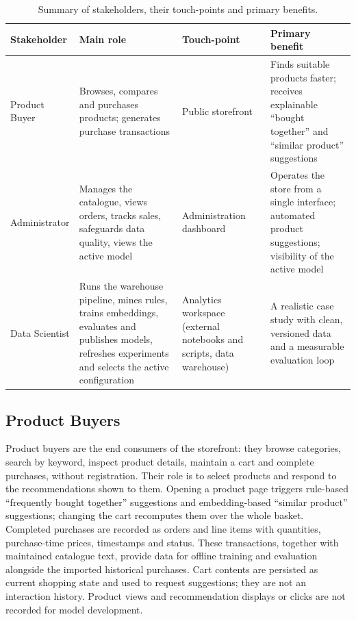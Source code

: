 \documentclass[a4paper,12pt]{article}
\newlength{\tablecontentwidth}
\newcommand{\tablestyle}{%
  \small\setstretch{1.05}%
  \renewcommand{\arraystretch}{1.25}%
  \setlength{\extrarowheight}{3pt}%
  \arrayrulecolor{tableborder}%
}
\begin{document}
\begin{table}[htbp]
  \centering
  \caption{Summary of stakeholders, their touch-points and primary benefits.}
  \label{tab:stakeholders}
  \tablestyle
  \begin{tabular}{|L{0.16\tablecontentwidth}|L{0.28\tablecontentwidth}|L{0.22\tablecontentwidth}|L{0.34\tablecontentwidth}|}
    \hline
    \textbf{Stakeholder} & \textbf{Main role} & \textbf{Touch-point} & \textbf{Primary benefit} \\[3pt]\hline
    Product Buyer & Browses, compares and purchases products; generates purchase transactions &
      Public storefront & Finds suitable products faster; receives explainable
      ``bought together'' and ``similar product'' suggestions \\[3pt]\hline
    Administrator & Manages the catalogue, views orders, tracks sales, safeguards data quality, views the
      active model & Administration dashboard & Operates the store from a single interface;
      automated product suggestions; visibility of the active model \\[3pt]\hline
    Data Scientist & Runs the warehouse pipeline, mines rules, trains embeddings, evaluates and
      publishes models, refreshes experiments and selects the active configuration & Analytics workspace (external notebooks
      and scripts, data
      warehouse) & A realistic case study with clean, versioned data and a measurable evaluation
      loop \\[3pt]\hline
  \end{tabular}
\end{table}

\subsection{Product Buyers}

Product buyers are the end consumers of the storefront: they browse categories, search by keyword,
inspect product details, maintain a cart and complete purchases, without registration. Their role
is to select products and respond to the recommendations shown to them. Opening a product page
triggers rule-based ``frequently bought together'' suggestions and embedding-based ``similar
product'' suggestions; changing the cart recomputes them over the whole basket. Completed purchases
are recorded as orders and line items with quantities, purchase-time prices,
timestamps and status. These transactions, together with maintained catalogue text, provide data for
offline training and evaluation alongside the imported historical purchases. Cart contents are
persisted as current shopping state and used to request suggestions; they are not an interaction
history. Product views and recommendation displays or clicks are not recorded for model development.
\end{document}
